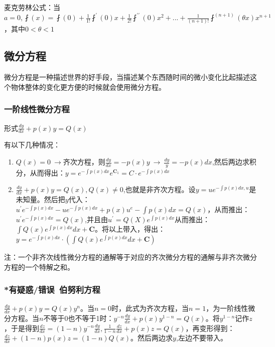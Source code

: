 \documentclass[UTF8]{ctexbook}
\newcommand{\derivative}{^\prime}
\newcommand{\doubleDerivative}{^{\prime\prime}}
\newcommand{\aLotDerivative}[1]{^{(#1)}}
\newcommand{\fDerivative}[1]{\fint\derivative(#1)}
\newcommand{\defFunction}[1]{\fint(#1)}
\newcommand{\mathConstant}{\mathbf{C}}
\begin{document}
{{{{麦克劳林公式：当$a = 0, \defFunction{x} = \defFunction{0} + \frac{1}{1!}\fDerivative{0}x + \frac{1}{2!}\fint\doubleDerivative(0)x^2 + ... + \frac{1}{(n + 1)!}\fint\aLotDerivative{n + 1}(\theta x)x^{n+1}$，其中$0 < \theta < 1$

}%

}%

\subsection{微分方程}{
微分方程是一种描述世界的好手段，当描述某个东西随时间的微小变化比起描述这个物体整体的变化更方便的时候就会使用微分方程。

\subsubsection{一阶线性微分方程}{
  形式$\frac{dy}{dx} + p(x)y = Q(x)$

  有以下几种情况：
  \begin{enumerate}
    \item $Q(x) = 0\ \to$齐次方程，则$\frac{dy}{dx} = -p(x)y\ \to \ \frac{dy}{y} = -p(x)dx$,然后两边求积分，从而得出：$y = e^{-\int p(x)dx}e^{\mathConstant_1} = C \cdot e^{-\int p(x)dx}$
    \item $\frac{dy}{dx} + p(x)y = Q(x), Q(x) \neq 0$,也就是非齐次方程。设$y = ue^{-\int p(x)dx, u}$是未知量。然后把$y$代入：\\ $u\derivative e^{-\int p(x)dx} - ue^{-\int p(x)dx} + p(x)u^{e}-\int p(x)dx = Q(x)$，从而推出：$u\derivative e^{-\int p(x)dx} = Q(x)$,并且由$u\derivative = Q(X)e^{\int p(x)dx}$从而推出：$\int Q(x)e^{\int p(x)dx}dx + \mathConstant$。将以上带入，得出：$y = e^{-\int p(x)dx}\cdot(\int Q(x)e^{\int p(x)dx}dx + \mathConstant)$
  \end{enumerate}

  注：一个非齐次线性微分方程的通解等于对应的齐次微分方程的通解与非齐次微分方程的一个特解之和。

}%

\subsubsection{*有疑惑/错误\ 伯努利方程}{
  $\frac{dy}{dx} + p(x)y = Q(x)y^n$。当$n = 0$时，此式为齐次方程，当$n = 1$，为一阶线性微分方程。当$n$不等于0也不等于1时：$y^{-n}\frac{dy}{dx} + p(x)y^{1-n} = Q(x)$。将$y^{1-n}$记作$z$，于是得到$\frac{dz}{dx} = (1-n)y^{-n}\frac{dy}{dx},\frac{1}{1-n}\frac{dz}{dx} + p(x)z = Q(x)$，再变形得到：$\frac{dz}{dx} + (1-n)p(x)z = (1-n)Q(x)$。然后两边求$y$,左边不要带入。

}}}}
\end{document}
